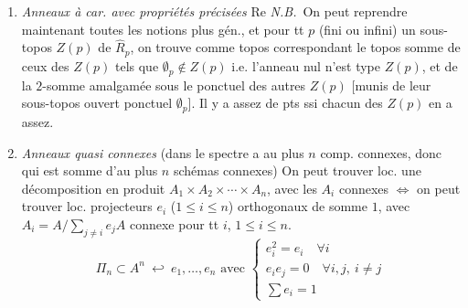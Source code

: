 \documentclass[11pt,a4paper]{article}
\begin{document}
\begin{enumerate}
  \item[21)] \emph{Anneaux à car. avec propriétés précisées}
    \struck{\ill{}} Re \emph{N.B.}\ On peut reprendre maintenant toutes
    les notions    plus gén., et  pour tt $p$ (fini
    ou infini) un sous-topos \struck{\ill{}} $Z(p)$ de
    $\hat{R}_{p}$, on trouve comme topos  correspondant le
    topos somme de ceux des $Z(p)$ tels que $\emptyset_{p} \notin Z(p)$ i.e.
    l'anneau nul \struck{\ill{}} n'est  type $Z(p)$, et de
    la $2$-somme amalgamée sous le   ponctuel des
    autres $Z(p)$ [munis de leur sous-topos ouvert ponctuel $\emptyset_{p}$].
    Il y a assez de pts ssi chacun des $Z(p)$ \struck{\ill{}} en a assez.
  \item[22)] \emph{Anneaux quasi\struck{\ill{}} connexes}  (dans le spectre a au plus $n$ comp. connexes, donc qui
    est somme d'au plus $n$ schémas connexes)   On
    peut trouver loc. une décomposition en produit $A_{1} \times
    A_{2} \times \cdots \times A_{n}$, avec les $A_{i}$ connexes
    $\Longleftrightarrow$ on peut trouver loc.  \ill{}
    projecteurs $e_{i}$ ($1 \leqslant i \leqslant n$) orthogonaux de somme
    $1$, avec $A_{i} = A / \sum_{j \neq i} e_{j} A$ connexe pour tt $i$,
    $1 \leqslant i \leqslant n$.
    \[
      \Pi_{n} \subset A^{n} \ \hookleftarrow\ e_{1}, \ldots, e_{n} \text{ avec }
      \begin{cases}
        e_{i}^{2} = e_{i} \quad \forall i \\
        e_{i} e_{j} = 0 \quad \forall i, j,\ i \neq j \\
        \sum e_{i} = 1
      \end{cases}
    \]



\end{enumerate}
\end{document}
